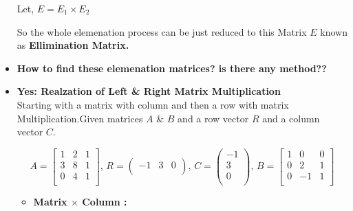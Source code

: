 \documentclass[a4paper,11pt]{article}
\numberwithin{equation}{section}
\begin{document}
\begin{itemize}
        \begin{center}
            Let,      $E=E_1 \times E_2$
        \end{center}

        So the whole elemenation process can be just reduced to this Matrix \textbf{$E$} known as \textbf{Ellimination Matrix.}

        \item \textbf{How to find these elemenation matrices? is there any method??}

        \item \textbf{Yes: Realzation of Left \& Right Matrix Multiplication}\\
            Starting with a matrix with column and then a row with matrix Multiplication.Given matrices $A$ \& $B$ and a row vector $R$ and a column vector $C$.

                \[
                    A=
                    \begin{bmatrix}
                        1 & 2 & 1 \\
                        3 & 8 & 1 \\
                        0 & 4 & 1 \\
                    \end{bmatrix} ,\hspace{2pt}
                    R=
                    \begin{pmatrix}
                        -1 & 3 & 0 \\
                    \end{pmatrix} , \hspace{2pt}
                    C=
                    \begin{pmatrix}
                        -1\\
                        3\\
                        0\\
                    \end{pmatrix} , \hspace{2pt}
                    B=
                    \begin{bmatrix}
                        1 & 0 & 0 \\
                        0 & 2 & 1 \\
                        0 & -1 & 1 \\
                    \end{bmatrix}
                \]


            \begin{itemize}
                \item \textbf{Matrix $ \times $ Column : }\\


\end{itemize}
\end{itemize}
\end{document}
